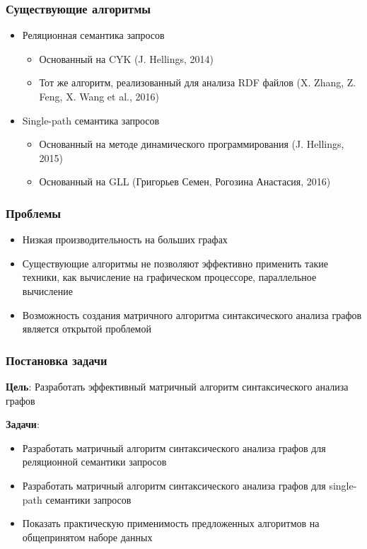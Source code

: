 \documentclass{beamer}
\begin{document}
\begin{frame}[fragile]
	\transwipe[direction=90]
	\frametitle{Существующие алгоритмы}
	\begin{itemize}
	   \item Реляционная семантика запросов
	   \begin{itemize}
	   	\item Основанный на CYK (J. Hellings, 2014) 
	   	\item Тот же алгоритм, реализованный для анализа RDF файлов (X. Zhang, Z. Feng, X. Wang et al., 2016)
	   \end{itemize}
   		\item Single-path семантика запросов
   	   \begin{itemize}
   	   	\item Основанный на методе динамического программирования (J. Hellings, 2015) 
   	   	\item Основанный на GLL (Григорьев Семен, Рогозина Анастасия, 2016)
   	   \end{itemize} 
	   
    \end{itemize}
\end{frame}

\begin{frame}[fragile]
	\transwipe[direction=90]
	\frametitle{Проблемы}
	\begin{itemize}
		\item Низкая производительность на больших графах
		\item Существующие алгоритмы не позволяют эффективно применить такие техники, как вычисление на графическом процессоре, параллельное вычисление
	   \item Возможность создания матричного алгоритма синтаксического анализа графов является открытой проблемой
    \end{itemize}
\end{frame}

\begin{frame}[fragile]
\transwipe[direction=90]
\frametitle{Постановка задачи}
\textbf{Цель}: Разработать эффективный матричный алгоритм синтаксического анализа графов

\textbf{Задачи}:
\begin{itemize}
	\item Разработать матричный алгоритм синтаксического анализа графов для реляционной семантики запросов
	\item Разработать матричный алгоритм синтаксического анализа графов для single-path семантики запросов
	\item Показать практическую применимость предложенных алгоритмов на общепринятом наборе данных
\end{itemize}
\end{frame}
\end{document}
